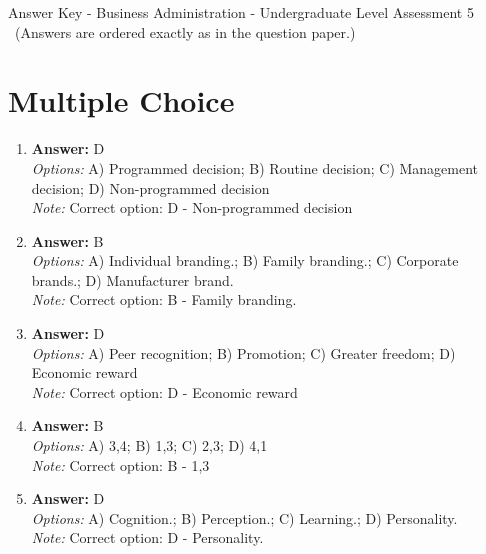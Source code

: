 \documentclass[12pt]{article}
\begin{document}
\begin{center}
Answer Key - Business Administration - Undergraduate Level Assessment 5 \
\small (Answers are ordered exactly as in the question paper.)
\end{center}

\section*{Multiple Choice}
\begin{enumerate}[label=\arabic*.]
\item \textbf{Answer:} D
\\ \textit{Options:} A) Programmed decision; B) Routine decision; C) Management decision; D) Non-programmed decision
\\ \textit{Note:} Correct option: D - Non-programmed decision
\item \textbf{Answer:} B
\\ \textit{Options:} A) Individual branding.; B) Family branding.; C) Corporate brands.; D) Manufacturer brand.
\\ \textit{Note:} Correct option: B - Family branding.
\item \textbf{Answer:} D
\\ \textit{Options:} A) Peer recognition; B) Promotion; C) Greater freedom; D) Economic reward
\\ \textit{Note:} Correct option: D - Economic reward
\item \textbf{Answer:} B
\\ \textit{Options:} A) 3,4; B) 1,3; C) 2,3; D) 4,1
\\ \textit{Note:} Correct option: B - 1,3
\item \textbf{Answer:} D
\\ \textit{Options:} A) Cognition.; B) Perception.; C) Learning.; D) Personality.
\\ \textit{Note:} Correct option: D - Personality.
\end{enumerate}
\end{document}
